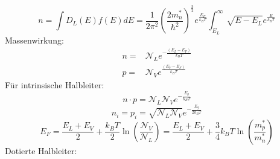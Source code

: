 \documentclass[11pt]{article}
\begin{document}
\begin{equation}
  n=\int D_L(E)f(E)dE=\frac{1}{2\pi^2}\left(\frac{2m_n^*}{\hbar^2}\right)^
  {\frac{3}{2}}e^{\frac{E_F}{k_BT}}\int_{E_L}^{\infty}\sqrt{E-E_L}
  e^{\frac{E}{k_BT}}
\end{equation}
Massenwirkung:
\begin{equation}\label{massenwirkung}
  \begin{align}
    n=&\mathcal{N}_Le^{-\frac{(E_L-E_F)}{k_BT}}\\
    p=&\mathcal{N}_Ve^{\frac{(E_V-E_F)}{k_BT}}
  \end{align}
\end{equation}
Für intrinsische Halbleiter:
\begin{equation}
  n\cdot p=\mathcal{N}_L\mathcal{N}_Ve^{-\frac{E_g}{k_BT}}
\end{equation}
\begin{equation}
  n_i=p_i=\sqrt{\mathcal{N}_L\mathcal{N}_V}e^{-\frac{E_g}{2k_BT}}
\end{equation}
\begin{equation}
  E_F=\frac{E_L+E_V}{2}+\frac{k_BT}{2}\ln(\frac{\mathcal{N}_V}{\mathcal{N}_L})
  =\frac{E_L+E_V}{2}+\frac{3}{4}k_BT\ln(\frac{m^*_p}{m^*_n})
\end{equation}
Dotierte Halbleiter:
\end{document}
